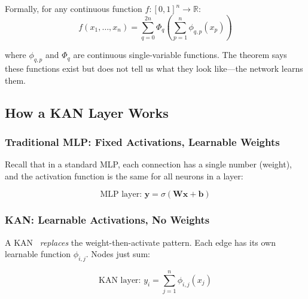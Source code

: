 Formally, for any continuous function $f : [0,1]^n \to \mathbb{R}$:
\begin{equation}
  f(x_1, \ldots, x_n) = \sum_{q=0}^{2n}
    \Phi_q\!\left(\sum_{p=1}^{n} \phi_{q,p}(x_p)\right)
  \label{eq:ka-theorem}
\end{equation}

where $\phi_{q,p}$ and $\Phi_q$ are continuous single-variable
functions. The theorem says these functions exist but does not tell
us what they look like---the network learns them.

\subsection{How a KAN Layer Works}

\subsubsection{Traditional MLP: Fixed Activations, Learnable Weights}

Recall that in a standard MLP, each connection has a single number
(weight), and the activation function is the same for all neurons in
a layer:

\begin{equation}
  \text{MLP layer: } \bm{y} = \sigma(\bm{W}\bm{x} + \bm{b})
  \label{eq:mlp-layer}
\end{equation}

\subsubsection{KAN: Learnable Activations, No Weights}

A KAN~\cite{liu2024kan} \emph{replaces} the weight-then-activate pattern. Each edge has
its own learnable function $\phi_{i,j}$. Nodes just sum:

\begin{equation}
  \text{KAN layer: } y_i = \sum_{j=1}^{n} \phi_{i,j}(x_j)
  \label{eq:kan-layer}
\end{equation}

